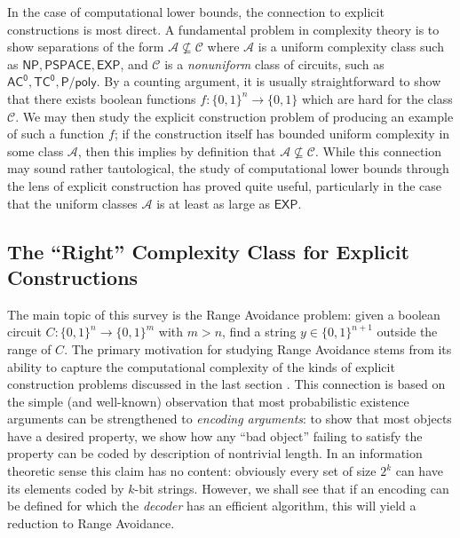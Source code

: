 \documentclass[11pt]{article}
\newcommand{\B}{\{0,1\}}
\begin{document}
In the case of computational lower bounds, the connection to explicit constructions is most direct. A fundamental problem in complexity theory is to show separations of the form $\mathcal{A} \not\subseteq \mathcal{C}$ where $\mathcal{A}$ is a uniform complexity class such as $\mathsf{NP}, \mathsf{PSPACE}, \mathsf{EXP}$, and $\mathcal{C}$ is a \emph{nonuniform} class of circuits, such as $\mathsf{AC^0}, \mathsf{TC^0}, \mathsf{P/poly}$. By a counting argument, it is usually straightforward to show that there exists boolean functions $f: \B^n \to \B$ which are hard for the class $\mathcal{C}$. We may then study the explicit construction problem of producing an example of such a function $f$; if the construction itself has bounded uniform complexity in some class $\mathcal{A}$, then this implies by definition that $\mathcal{A} \not\subseteq \mathcal{C}$. While this connection may sound rather tautological, the study of computational lower bounds through the lens of explicit construction has proved quite useful, particularly in the case that the uniform classes $\mathcal{A}$ is at least as large as $\mathsf{EXP}$. 

\subsection{The ``Right'' Complexity Class for Explicit Constructions}
The main topic of this survey is the Range Avoidance problem: given a boolean circuit $C: \B^n \to \B^{m}$ with $m > n$, find a string $y \in \B^{n+1}$ outside the range of $C$. The primary motivation for studying Range Avoidance stems from its ability to capture the computational complexity of the kinds of explicit construction problems discussed in the last section \cite{Korten1}. This connection is based on the simple (and well-known) observation that most probabilistic existence arguments can be strengthened to \emph{encoding arguments}: to show that most objects have a desired property, we show how any ``bad object'' failing to satisfy the property can be coded by description of nontrivial length. In an information theoretic sense this claim has no content: obviously every set of size $2^k$ can have its elements coded by $k$-bit strings. However, we shall see that if an encoding can be defined for which the \emph{decoder} has an efficient algorithm, this will yield a reduction to Range Avoidance.
\end{document}
